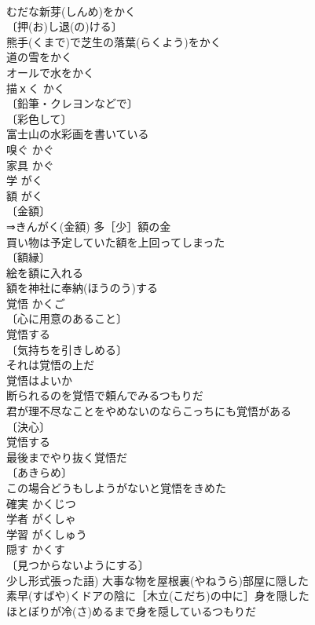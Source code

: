 \documentclass[8pt]{extreport}
\begin{document}
\begin{CJK}{UTF8}{min}
\\	むだな新芽(しんめ)をかく 
\\	〔押(お)し退(の)ける〕
\\	熊手(くまで)で芝生の落葉(らくよう)をかく 
\\	道の雪をかく 
\\	オールで水をかく 
\\	描ｘく	かく	
\\	〔鉛筆・クレヨンなどで〕
\\	〔彩色して〕
\\	富士山の水彩画を書いている 
\\	嗅ぐ	かぐ	
\\	家具	かぐ	
\\	学	がく	
\\	額	がく	
\\	〔金額〕
\\	⇒きんがく(金額) 多［少］額の金 
\\	買い物は予定していた額を上回ってしまった 
\\	〔額縁〕
\\	絵を額に入れる 
\\	額を神社に奉納(ほうのう)する 
\\	覚悟	かくご	
\\	〔心に用意のあること〕
\\	覚悟する 
\\	〔気持ちを引きしめる〕
\\	それは覚悟の上だ 
\\	覚悟はよいか 
\\	断られるのを覚悟で頼んでみるつもりだ 
\\	君が理不尽なことをやめないのならこっちにも覚悟がある 
\\	〔決心〕
\\	覚悟する 
\\	最後までやり抜く覚悟だ 
\\	〔あきらめ〕
\\	この場合どうもしようがないと覚悟をきめた 
\\	確実	かくじつ	
\\	学者	がくしゃ	
\\	学習	がくしゅう	
\\	隠す	かくす	
\\	〔見つからないようにする〕
\\	少し形式張った語) 大事な物を屋根裏(やねうら)部屋に隠した 
\\	素早(すばや)くドアの陰に［木立(こだち)の中に］身を隠した 
\\	ほとぼりが冷(さ)めるまで身を隠しているつもりだ 

\end{CJK}
\end{document}

